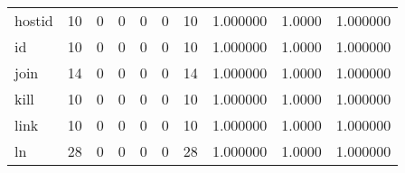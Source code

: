 \begin{tabular}{lrrrrrrrrr}
hostid    &                                       10 &                                                  0 &                                                  0 &                                                  0 &                                                  0 &                                                 10 &                                           1.000000 &                                 1.0000 &                             1.000000 \\
id        &                                       10 &                                                  0 &                                                  0 &                                                  0 &                                                  0 &                                                 10 &                                           1.000000 &                                 1.0000 &                             1.000000 \\
join      &                                       14 &                                                  0 &                                                  0 &                                                  0 &                                                  0 &                                                 14 &                                           1.000000 &                                 1.0000 &                             1.000000 \\
kill      &                                       10 &                                                  0 &                                                  0 &                                                  0 &                                                  0 &                                                 10 &                                           1.000000 &                                 1.0000 &                             1.000000 \\
link      &                                       10 &                                                  0 &                                                  0 &                                                  0 &                                                  0 &                                                 10 &                                           1.000000 &                                 1.0000 &                             1.000000 \\
ln        &                                       28 &                                                  0 &                                                  0 &                                                  0 &                                                  0 &                                                 28 &                                           1.000000 &                                 1.0000 &                             1.000000 \\

\end{tabular}
